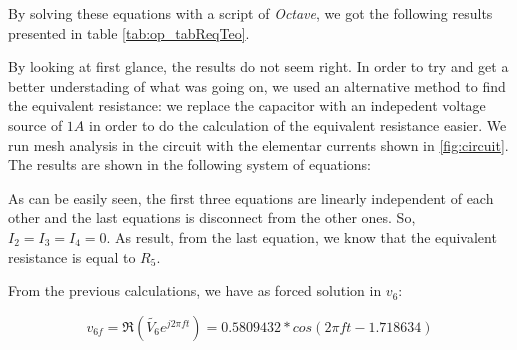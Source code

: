 \hfill

%       
%       



By solving these equations with a script of \textit{Octave}, we got the following results presented in table \ref{tab:op_tabReqTeo}.


By looking at first glance, the results do not seem right. In order to try and get a better understading of what was going on, we used an alternative method to find the equivalent resistance: we replace the capacitor with an indepedent voltage source of $1 A$ in order to do the calculation of the equivalent resistance easier.
We run mesh analysis in the circuit with the elementar currents shown in \ref{fig:circuit}. The results are shown in the following system of equations:


As can be easily seen, the first three equations are linearly independent of each other and the last equations is disconnect from the other ones. So, $I_2 = I_3 = I_4 = 0$. As result, from the last equation, we know that
the equivalent resistance is equal to $R_5$.


From the previous calculations, we have as forced solution in $v_6$:

\begin{equation}
  v_{6f} = \Re (\tilde{V_6} e^{j 2\pi f t}) = 0.5809432*cos(2 \pi f t - 1.718634)
  \label{forcedSolution}
\end{equation}




